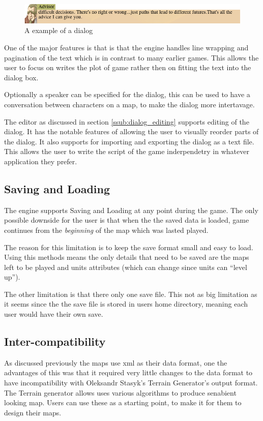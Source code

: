 \begin{figure}[htbp]
	\centering
		\includegraphics[width=6.3in]{figures/dialog2.png}
	\caption{A example of a dialog}
	\label{fig:figures_dialog2}
\end{figure}

One of the major features is that is that the engine handles line wrapping and pagination of the text which is in contrast to many earlier games. This allows the user to focus on writes the plot of game rather then on fitting the text into the dialog box. 

Optionally a speaker can be specified for the dialog, this can be used to have a conversation between characters on a map, to make the dialog more intertavage. 

The editor as discussed in section \ref{ssub:dialog_editing} supports editing of the dialog. It has the notable features of allowing the user to visually reorder parts of the dialog. It also supports for  importing and exporting the dialog as a text file.  This allows the user to write the script of the game inderpendetry in whatever application they prefer. 


\subsection{Saving and Loading}
The engine supports Saving and Loading at any point during the game. The only possible downside  for the user is that when the the saved data is loaded, game continues from the \emph{beginning} of the map which was lasted played. 

The reason for this limitation is to keep the save format small and easy to load. Using this methods means the only details that need to be saved are the maps left to be played and units attributes (which can change since units can ``level up''). 

The other limitation is that there only one save file. This not as big limitation as it seems since the the save file is stored in users home directory, meaning each user would have their own save.

\subsection{Inter-compatibility}
\label{ssub:intercompatibility}
As discussed previously the maps use xml as their data format, one the advantages of this was that it required very little changes to the data format to have incompatibility with Oleksandr Stasyk's  Terrain Generator's output format.  The Terrain generator allows uses various algorithms to produce senabient looking map. Users can use these as a starting point, to make it for them to design their maps.

